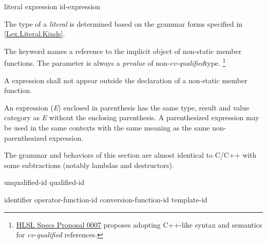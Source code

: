
\begin{grammar}
  \br
  literal\br
  \br
  \terminal{(} expression \terminal{)}\br
  id-expression\br
\end{grammar}


\p The type of a \textit{literal} is determined based on the grammar forms
specified in \ref{Lex.Literal.Kinds}.


\p The keyword  names a reference to the implicit object of
non-static member functions. The  parameter is always a
\textit{prvalue} of non-\textit{cv-qualified}type.
\footnote{
  \href{https://github.com/microsoft/hlsl-specs/blob/main/proposals/0007-const-instance-methods.md}
  {HLSL Specs Proposal 0007} proposes adopting C++-like syntax and semantics for
  \textit{cv-qualified}  references.}

\p A  expression shall not appear outside the declaration of a
non-static member function.


\p An expression (\textit{E}) enclosed in parenthesis has the same type, result
and value category as \textit{E} without the enclosing parenthesis. A
parenthesized expression may be used in the same contexts with the same meaning
as the same non-parenthesized expression.


\begin{note}
  The grammar and behaviors of this section are almost identical to C/C++ with
  some subtractions (notably lambdas and destructors).
\end{note}

\begin{grammar}
  \br
  unqualified-id\br
  qualified-id
\end{grammar}


\begin{grammar}
  \br
  identifier\br
  operator-function-id\br
  conversion-function-id\br
  template-id\br
\end{grammar}


